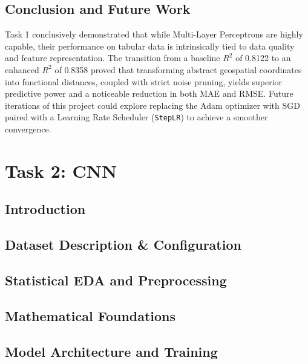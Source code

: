 \documentclass[a4paper,12pt]{extarticle}
\begin{document}
\subsection{Conclusion and Future Work}
Task 1 conclusively demonstrated that while Multi-Layer Perceptrons are highly capable, their performance on tabular data is intrinsically tied to data quality and feature representation. The transition from a baseline $R^2$ of 0.8122 to an enhanced $R^2$ of 0.8358 proved that transforming abstract geospatial coordinates into functional distances, coupled with strict noise pruning, yields superior predictive power and a noticeable reduction in both MAE and RMSE. Future iterations of this project could explore replacing the Adam optimizer with SGD paired with a Learning Rate Scheduler (\texttt{StepLR}) to achieve a smoother convergence.

\clearpage

\section{Task 2: CNN}

\subsection{Introduction}

\subsection{Dataset Description \& Configuration}

\subsection{Statistical EDA and Preprocessing}

\subsection{Mathematical Foundations}

\subsection{Model Architecture and Training}
\end{document}
